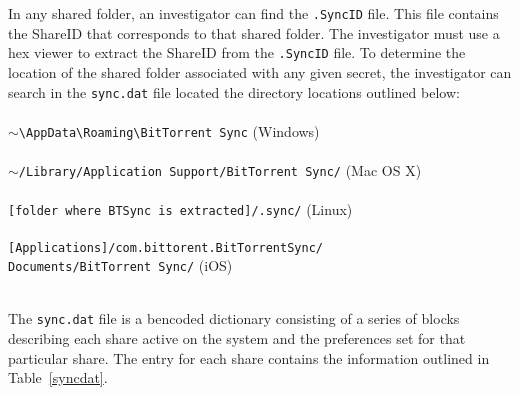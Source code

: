 \documentclass{jdfsl}
\begin{document}
In any shared folder, an investigator can find the \texttt{.SyncID} file. This file contains the ShareID that corresponds to that shared folder. The investigator must use a hex viewer to extract the ShareID from the \texttt{.SyncID} file. To determine the location of the shared folder associated with any given secret, the investigator can search in the \texttt{sync.dat} file located the directory locations outlined below:\\ \\ \footnotesize \texttt{$\sim$\textbackslash AppData\textbackslash Roaming\textbackslash BitTorrent Sync} (Windows)\\\\
 \texttt{$\sim$/Library/Application Support/BitTorrent Sync/} (Mac OS X)\\
\\\texttt{[folder where BTSync is extracted]/.sync/} (Linux)\\\\
\texttt{[Applications]/com.bittorent.BitTorrentSync/\\Documents/BitTorrent Sync/} (iOS)
\\\\
\normalsize

The \texttt{sync.dat} file is a bencoded dictionary consisting of a series of blocks describing each share active on the system and the preferences set for that particular share. The entry for each share contains the information outlined in Table~\ref{syncdat}.
\end{document}
